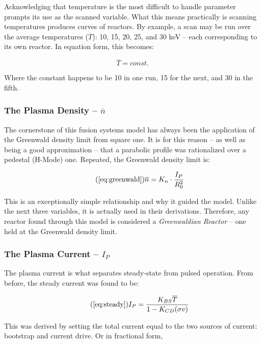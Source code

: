 Acknowledging that temperature is the most difficult to handle parameter prompts its use as the scanned variable. What this means practically is scanning temperatures produces curves of reactors. By example, a scan may be run over the average temperatures ($\overline T$): 10, 15, 20, 25, and 30 keV -- each corresponding to its own reactor. In equation form, this becomes:

\begin{equation}
	\label{eq:tbar}
	\overline T = const.
\end{equation}

Where the constant happens to be 10 in one run, 15 for the next, and 30 in the fifth.

\subsubsection{The Plasma Density -- $\overline n$}

The cornerstone of this fusion systems model has always been the application of the Greenwald density limit from square one. It is for this reason -- as well as being a good approximation -- that a parabolic profile was rationalized over a pedestal (H-Mode) one. Repeated, the Greenwald density limit is:

\begin{equation}
	\tag{\ref{eq:greenwald}}
	\overline n = K_n \cdot \frac{I_P}{R_0^2}
\end{equation}

This is an exceptionally simple relationship and why it guided the model. Unlike the next three variables, it is actually used in their derivations. Therefore, any reactor found through this model is considered a \emph{Greenwaldian Reactor} -- one held at the Greenwald density limit.

\subsubsection{The Plasma Current -- $I_P$}

The plasma current is what separates steady-state from pulsed operation. From before, the steady current was found to be:

\begin{equation}
	\tag{\ref{eq:steady}}
	I_P = \frac{K_{BS} \overline T}{1 - K_{CD} ( \sigma v ) }
\end{equation}

This was derived by setting the total current equal to the two sources of current: bootstrap and current drive. Or in fractional form,

